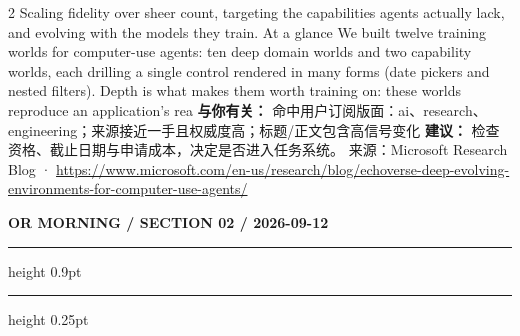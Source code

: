 \documentclass[10.5pt]{ctexart}
\begin{document}
\begin{multicols}{2}
Scaling fidelity over sheer count, targeting the capabilities agents actually lack, and evolving with the models they train. At a glance We built twelve training worlds for computer-use agents: ten deep domain worlds and two capability worlds, each drilling a single control rendered in many forms (date pickers and nested filters). Depth is what makes them worth training on: these worlds reproduce an application’s rea
\textbf{与你有关：} 命中用户订阅版面：ai、research、engineering；来源接近一手且权威度高；标题/正文包含高信号变化
\textbf{建议：} 检查资格、截止日期与申请成本，决定是否进入任务系统。
{\footnotesize\color{ormuted} 来源：Microsoft Research Blog · \url{https://www.microsoft.com/en-us/research/blog/echoverse-deep-evolving-environments-for-computer-use-agents/}}
\end{multicols}
\newpage
{\small\bfseries OR MORNING / SECTION 02 / 2026-09-12}
\vspace{2mm}
\hrule height 0.9pt
\vspace{1.5mm}
\hrule height 0.25pt
\vspace{4mm}
\end{document}
